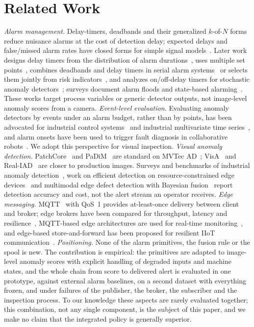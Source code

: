 \documentclass[conference]{IEEEtran}
\begin{document}
\section{Related Work}
\emph{Alarm management.} Delay-timers, deadbands and their generalized $k$-of-$N$ forms reduce nuisance alarms at the cost of detection delay; expected delays and false/missed alarm rates have closed forms for simple signal models~\cite{adnan2011delay,adnan2013generalized,afzal2018deadband}. Later work designs delay timers from the distribution of alarm durations~\cite{wang2022pmf}, uses multiple set points~\cite{su2018multisetpoint}, combines deadbands and delay timers in serial alarm systems~\cite{gyasi2022serial} or selects them jointly from risk indicators~\cite{zhang2024risk}, and analyzes on/off-delay timers for stochastic anomaly detectors~\cite{zhou2025onoff}; surveys document alarm floods and state-based alarming~\cite{wang2016alarm,goel2017alarm}. These works target process variables or generic detector outputs, not image-level anomaly scores from a camera.
\emph{Event-level evaluation.} Evaluating anomaly detectors by events under an alarm budget, rather than by points, has been advocated for industrial control systems~\cite{heydari2026alarm} and industrial multivariate time series~\cite{yu2026eventlevel}, and alarm onsets have been used to trigger fault diagnosis in collaborative robots~\cite{sadik2026onset}. We adopt this perspective for visual inspection.
\emph{Visual anomaly detection.} PatchCore~\cite{roth2022patchcore} and PaDiM~\cite{defard2021padim} are standard on MVTec AD~\cite{bergmann2019mvtec}; VisA~\cite{zou2022visa} and Real-IAD~\cite{wang2024realiad} are closer to production images. Surveys and benchmarks of industrial anomaly detection~\cite{li2025survey,cools2025benchmark}, work on efficient detection on resource-constrained edge devices~\cite{stropeni2026edge} and multimodal edge defect detection with Bayesian fusion~\cite{lin2025multimodal} report detection accuracy and cost, not the alert stream an operator receives.
\emph{Edge messaging.} MQTT~\cite{mqtt311} with QoS~1 provides at-least-once delivery between client and broker; edge brokers have been compared for throughput, latency and resilience~\cite{koziolek2020mqtt,gruener2021mqtt}, MQTT-based edge architectures are used for real-time monitoring~\cite{mohammed2026mqtt}, and edge-based store-and-forward has been proposed for resilient IIoT communication~\cite{matias2026storeforward}.
\emph{Positioning.} None of the alarm primitives, the fusion rule or the spool is new. The contribution is empirical: the primitives are adapted to image-level anomaly scores with explicit handling of degraded inputs and machine states, and the whole chain from score to delivered alert is evaluated in one prototype, against external alarm baselines, on a second dataset with everything frozen, and under failures of the publisher, the broker, the subscriber and the inspection process. To our knowledge these aspects are rarely evaluated together; this combination, not any single component, is the subject of this paper, and we make no claim that the integrated policy is generally superior.
\end{document}
